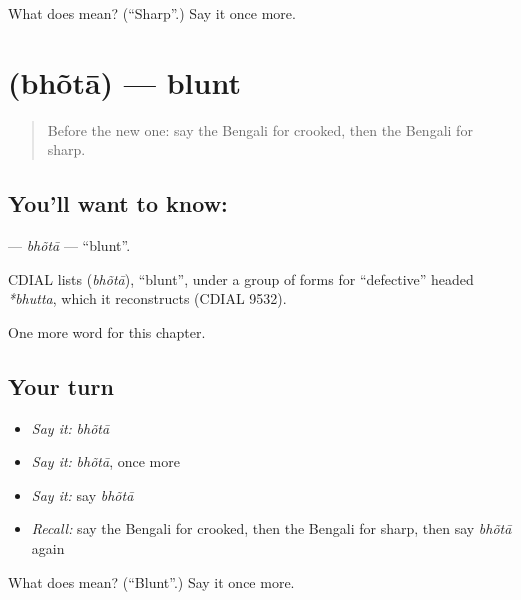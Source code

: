 \begin{tcolorbox}[breakable,colback=teal!4,colframe=teal!35!black,title={Before you move on}]
What does  mean? (\textquotedblleft{}Sharp\textquotedblright{}.) Say it once more.
\end{tcolorbox}
\section[\texorpdfstring{\bn{ভোঁতা} (bhõtā)}{ভোঁতা (bhõtā)}]{ (bhõtā) — blunt}

\label{lesson:BN-C140-bhota}



\begin{quote}
Before the new one: say the Bengali for crooked, then the Bengali for sharp.
\end{quote}

\subsection*{You'll want to know: }
\textbf{} — \emph{bhõtā} — \textquotedblleft{}blunt\textquotedblright{}.

\begin{cousinweb}
CDIAL lists \textbf{} (\emph{bhõtā}), \textquotedblleft{}blunt\textquotedblright{}, under a group of forms for \textquotedblleft{}defective\textquotedblright{} headed \emph{*bhutta}, which it reconstructs (CDIAL 9532).
\end{cousinweb}

\begin{grammarlens}[title={What you've built}]
One more word for this chapter.
\end{grammarlens}

\subsection*{Your turn}
\begin{itemize}
\raggedright
  \item \emph{Say it:} \emph{bhõtā}
  \item \emph{Say it:} \emph{bhõtā}, once more
  \item \emph{Say it:} say \emph{bhõtā}
  \item \emph{Recall:} say the Bengali for crooked, then the Bengali for sharp, then say \emph{bhõtā} again
\end{itemize}

\begin{tcolorbox}[breakable,colback=teal!4,colframe=teal!35!black,title={Before you move on}]
What does  mean? (\textquotedblleft{}Blunt\textquotedblright{}.) Say it once more.
\end{tcolorbox}
